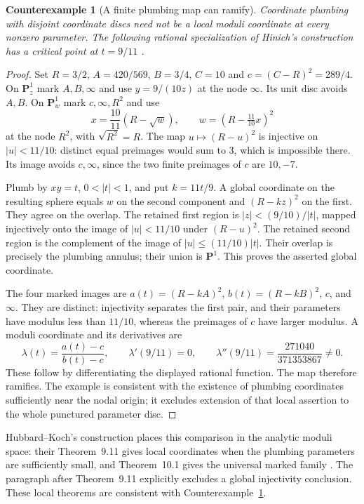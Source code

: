 \documentclass[11pt,a4paper]{article}
\newtheorem{counterexample}[theorem]{Counterexample}
\theoremstyle{definition}
\begin{document}
\begin{counterexample}[A finite plumbing map can ramify]\label{ex:hinich}
Coordinate plumbing with disjoint coordinate discs need not be a local moduli coordinate at every nonzero parameter. The following rational specialization of Hinich's construction has a critical point at $t=9/11$ \cite[\S\S2.1--2.3, pp.~3--5]{Hinich}.
\end{counterexample}
\begin{proof}
Set $R=3/2$, $A=420/569$, $B=3/4$, $C=10$ and $c=(C-R)^2=289/4$. On $\mathbf P^1_z$ mark $A,B,\infty$ and use $y=9/(10z)$ at the node $\infty$. Its unit disc avoids $A,B$. On $\mathbf P^1_w$ mark $c,\infty,R^2$ and use
\[
 x=\frac{10}{11}(R-\sqrt w),\qquad
 w=(R-\tfrac{11}{10}x)^2
\]
at the node $R^2$, with $\sqrt{R^2}=R$. The map $u\mapsto(R-u)^2$ is injective on $|u|<11/10$: distinct equal preimages would sum to $3$, which is impossible there. Its image avoids $c,\infty$, since the two finite preimages of $c$ are $10,-7$.

Plumb by $xy=t$, $0<|t|<1$, and put $k=11t/9$. A global coordinate on the resulting sphere equals $w$ on the second component and $(R-kz)^2$ on the first. They agree on the overlap. The retained first region is $|z|<(9/10)/|t|$, mapped injectively onto the image of $|u|<11/10$ under $(R-u)^2$. The retained second region is the complement of the image of $|u|\le(11/10)|t|$. Their overlap is precisely the plumbing annulus; their union is $\mathbf P^1$. This proves the asserted global coordinate.

The four marked images are $a(t)=(R-kA)^2$, $b(t)=(R-kB)^2$, $c$, and $\infty$. They are distinct: injectivity separates the first pair, and their parameters have modulus less than $11/10$, whereas the preimages of $c$ have larger modulus. A moduli coordinate and its derivatives are
\[
 \lambda(t)=\frac{a(t)-c}{b(t)-c},\qquad
 \lambda'(9/11)=0,\qquad
 \lambda''(9/11)=\frac{271040}{371353867}\ne0.
\]
These follow by differentiating the displayed rational function. The map therefore ramifies. The example is consistent with the existence of plumbing coordinates sufficiently near the nodal origin; it excludes extension of that local assertion to the whole punctured parameter disc.
\end{proof}

Hubbard--Koch's construction places this comparison in the analytic moduli space: their Theorem~9.11 gives local coordinates when the plumbing parameters are sufficiently small, and Theorem~10.1 gives the universal marked family \cite[author version, p.~36]{HubbardKoch}. The paragraph after Theorem~9.11 explicitly excludes a global injectivity conclusion. These local theorems are consistent with Counterexample~\ref{ex:hinich}.
\end{document}
